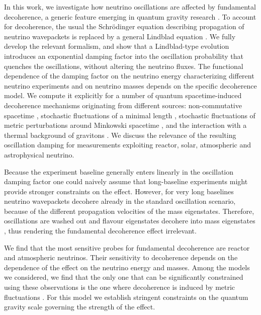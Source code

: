 \documentclass[11pt]{article}
\begin{document}
In this work, we investigate how neutrino oscillations are affected by fundamental decoherence, a generic feature emerging in  quantum gravity research \cite{Arzano:2022nlo,Petruzziello:2020wkd,Breuer:2008rh, Diosi1984, Percival:1995an, Gambini:2004de, Bassi:2017szd}. To account for decoherence, the usual the Schr\"{o}dinger equation describing  propagation of neutrino wavepackets is replaced by  a general Lindblad equation \cite{Lindblad1976}. 
We fully develop the relevant formalism, and show that a Lindblad-type evolution introduces an exponential damping factor into the oscillation probability that quenches the oscillations, without altering the neutrino fluxes. The functional dependence of the damping factor on the neutrino energy characterizing different neutrino experiments and on neutrino masses depends   on the specific decoherence model. We compute it explicitly for a number of quantum spacetime-induced decoherence mechanisms originating from different sources: non-commutative spacetime \cite{Arzano:2022nlo}, stochastic fluctuations of a minimal length \cite{Petruzziello:2020wkd}, stochastic fluctuations of metric perturbations around Minkowski spacetime \cite{Breuer:2008rh}, and the interaction with a thermal background of gravitons \cite{Blencowe:2012mp}. We discuss the relevance of the resulting oscillation damping for  measurements exploiting  reactor, solar, atmospheric and astrophysical neutrino.

Because the  experiment baseline generally enters  linearly in the oscillation damping factor one could naively assume that long-baseline experiments might provide stronger constraints on the effect. However, for very long baselines neutrino wavepackets decohere already in the standard oscillation scenario, because of the different propagation velocities of the mass eigenstates. Therefore, oscillations are washed out and flavour eigenstates  decohere into mass eigenstates \cite{Farzan:2008eg,Akhmedov:2009rb, Addazi2022, Giunti:1997wq}, thus rendering the fundamental decoherence effect irrelevant. 

We find that the most sensitive probes for fundamental decoherence are reactor and atmospheric neutrinos. Their sensitivity to decoherence depends on the dependence of the effect on the neutrino energy and masses.
Among the models we considered, we find that the only one that can be significantly constrained using these observations is the one where decoherence is induced by metric fluctuations \cite{Breuer:2008rh}. For this model we establish stringent constraints on the quantum gravity scale governing the strength of the effect. 
\end{document}
